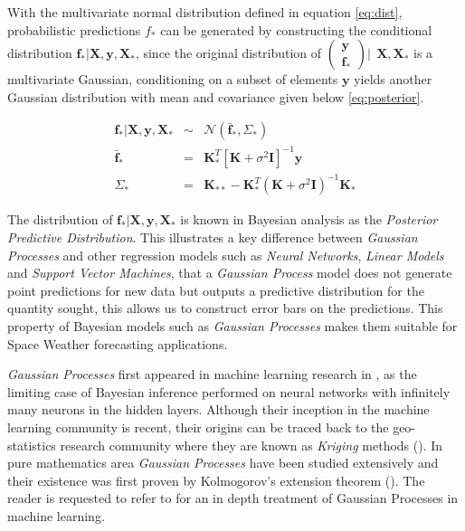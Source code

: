 \documentclass[referee,a4paper,12pt,traditabstract]{swsc}
\begin{document}
\begin{linenumbers}
With the multivariate normal distribution defined in equation \ref{eq:dist}, probabilistic predictions $f_*$ can be generated by constructing the conditional distribution $\mathbf{f_*}|\mathbf{X},\mathbf{y},\mathbf{X_*}$, since the original distribution of $\left( \begin{array}{c} \mathbf{y} \\ \mathbf{f_*} \end{array} \right) | \ \ \mathbf{X}, \mathbf{X}_*$ is a multivariate Gaussian, conditioning on a subset of elements $\mathbf{y}$ yields another Gaussian distribution with mean and covariance given below \ref{eq:posterior}.

\begin{eqnarray}
    \mathbf{f_*}|\mathbf{X},\mathbf{y},\mathbf{X_*} & \sim & \mathcal{N}(\mathbf{\bar{f}_*}, \Sigma_*)  \label{eq:posterior} \\
    \mathbf{\bar{f}_*} & = & \mathbf{K}^T_{*} [\mathbf{K} + \sigma^{2} \mathbf{I}]^{-1} \mathbf{y} \label{eq:posteriormean} \\
    \Sigma_* & = & \mathbf{K}_{**} - \mathbf{K}^T_{*} \left(\mathbf{K} + \sigma^{2} \mathbf{I}\right)^{-1} \mathbf{K}_{*} \label{eq:posteriorcov}
\end{eqnarray}

The distribution of $\mathbf{f_*}| \mathbf{X},\mathbf{y},\mathbf{X_*}$ is known in Bayesian analysis as the \emph{Posterior Predictive Distribution}. This illustrates a key difference between \emph{Gaussian Processes} and other regression models such as \emph{Neural Networks}, \emph{Linear Models} and \emph{Support Vector Machines}, that a \emph{Gaussian Process} model does not generate point predictions for new data but outputs a predictive distribution for the quantity sought, this allows us to construct error bars on the predictions. This property of Bayesian models such as \emph{Gaussian Processes} makes them suitable for Space Weather forecasting applications. 

\emph{Gaussian Processes} first appeared in machine learning research in \citet{Neal:1996:BLN:525544}, as the limiting case of Bayesian inference performed on neural networks with infinitely many neurons in the hidden layers. Although their inception in the machine learning community is recent, their origins can be traced back to the geo-statistics research community where they are known as \emph{Kriging} methods (\citet{krige1951statistical}). In pure mathematics area \emph{Gaussian Processes} have been studied extensively and their existence was first proven by Kolmogorov's extension theorem (\citet{tao2011introduction}). The reader is requested to refer to \cite{Rasmussen:2005:GPM:1162254} for an in depth treatment of Gaussian Processes in machine learning.


\end{linenumbers}
\end{document}
